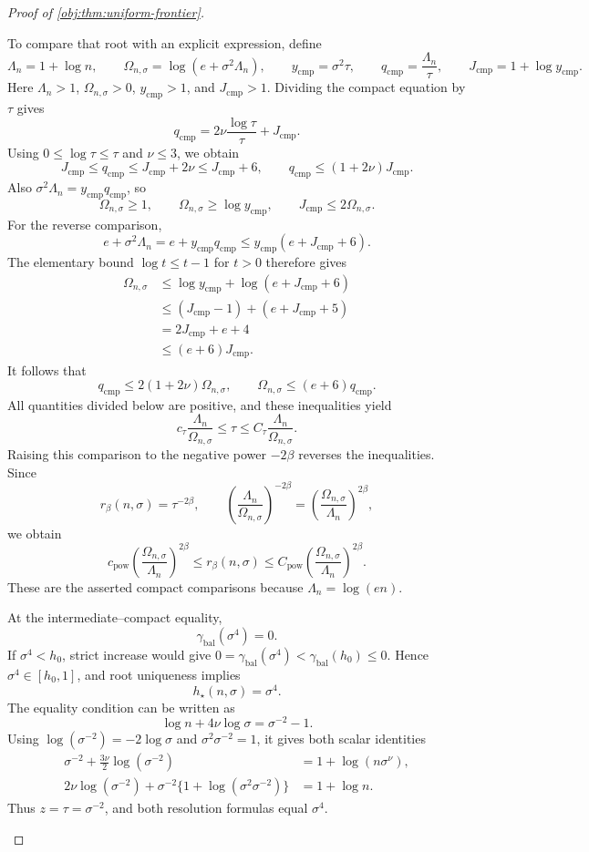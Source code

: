 \begin{proof}[Proof of \cref{obj:thm:uniform-frontier}]
\begin{enumerate}
To compare that root with an explicit expression, define
\[
\Lambda_n=1+\log n,\qquad
\Omega_{n,\sigma}=\log(e+\sigma^2\Lambda_n),\qquad
y_{\mathrm{cmp}}=\sigma^2\tau,\qquad
q_{\mathrm{cmp}}=\frac{\Lambda_n}{\tau},\qquad
J_{\mathrm{cmp}}=1+\log y_{\mathrm{cmp}}.
\]
Here \(\Lambda_n>1\), \(\Omega_{n,\sigma}>0\),
\(y_{\mathrm{cmp}}>1\), and \(J_{\mathrm{cmp}}>1\). Dividing the compact
equation by \(\tau\) gives
\[
q_{\mathrm{cmp}}
=2\nu\frac{\log\tau}{\tau}+J_{\mathrm{cmp}}.
\]
Using \(0\le\log\tau\le\tau\) and \(\nu\le3\), we obtain
\[
J_{\mathrm{cmp}}\le q_{\mathrm{cmp}}
\le J_{\mathrm{cmp}}+2\nu
\le J_{\mathrm{cmp}}+6,
\qquad
q_{\mathrm{cmp}}\le(1+2\nu)J_{\mathrm{cmp}}.
\]
Also \(\sigma^2\Lambda_n=y_{\mathrm{cmp}}q_{\mathrm{cmp}}\), so
\[
\Omega_{n,\sigma}\ge1,\qquad
\Omega_{n,\sigma}\ge\log y_{\mathrm{cmp}},
\qquad
J_{\mathrm{cmp}}\le2\Omega_{n,\sigma}.
\]
For the reverse comparison,
\[
e+\sigma^2\Lambda_n
=e+y_{\mathrm{cmp}}q_{\mathrm{cmp}}
\le y_{\mathrm{cmp}}(e+J_{\mathrm{cmp}}+6).
\]
The elementary bound \(\log t\le t-1\) for \(t>0\) therefore gives
\[
\begin{aligned}
\Omega_{n,\sigma}
&\le\log y_{\mathrm{cmp}}+\log(e+J_{\mathrm{cmp}}+6)\\
&\le(J_{\mathrm{cmp}}-1)+(e+J_{\mathrm{cmp}}+5)\\
&=2J_{\mathrm{cmp}}+e+4\\
&\le(e+6)J_{\mathrm{cmp}}.
\end{aligned}
\]
It follows that
\[
q_{\mathrm{cmp}}\le2(1+2\nu)\Omega_{n,\sigma},
\qquad
\Omega_{n,\sigma}\le(e+6)q_{\mathrm{cmp}}.
\]
All quantities divided below are positive, and these inequalities yield
\[
c_\tau\frac{\Lambda_n}{\Omega_{n,\sigma}}
\le\tau
\le C_\tau\frac{\Lambda_n}{\Omega_{n,\sigma}}.
\]
Raising this comparison to the negative power \(-2\beta\) reverses the
inequalities. Since
\[
r_\beta(n,\sigma)=\tau^{-2\beta},
\qquad
\left(\frac{\Lambda_n}{\Omega_{n,\sigma}}\right)^{-2\beta}
=\left(\frac{\Omega_{n,\sigma}}{\Lambda_n}\right)^{2\beta},
\]
we obtain
\[
c_{\mathrm{pow}}
\left(\frac{\Omega_{n,\sigma}}{\Lambda_n}\right)^{2\beta}
\le r_\beta(n,\sigma)
\le C_{\mathrm{pow}}
\left(\frac{\Omega_{n,\sigma}}{\Lambda_n}\right)^{2\beta}.
\]
These are the asserted compact comparisons because
\(\Lambda_n=\log(en)\).

At the intermediate--compact equality,
\[
\gamma_{\mathrm{bal}}(\sigma^4)=0.
\]
If \(\sigma^4<h_0\), strict increase would give
\(0=\gamma_{\mathrm{bal}}(\sigma^4)<\gamma_{\mathrm{bal}}(h_0)\le0\).
Hence \(\sigma^4\in[h_0,1]\), and root uniqueness implies
\[
h_\star(n,\sigma)=\sigma^4.
\]
The equality condition can be written as
\[
\log n+4\nu\log\sigma=\sigma^{-2}-1.
\]
Using \(\log(\sigma^{-2})=-2\log\sigma\) and
\(\sigma^2\sigma^{-2}=1\), it gives both scalar identities
\[
\begin{aligned}
\sigma^{-2}+\frac{3\nu}{2}\log(\sigma^{-2})
&=1+\log(n\sigma^\nu),\\
2\nu\log(\sigma^{-2})
+\sigma^{-2}\{1+\log(\sigma^2\sigma^{-2})\}
&=1+\log n.
\end{aligned}
\]
Thus \(z=\tau=\sigma^{-2}\), and both resolution formulas equal \(\sigma^4\).


\end{enumerate}
\end{proof}
